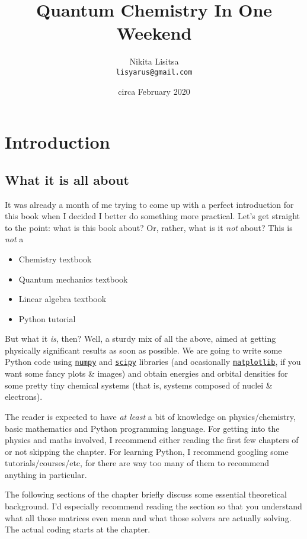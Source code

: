 \documentclass{book}
\title{Quantum Chemistry In One Weekend}
\author{Nikita Lisitsa \\ \texttt{lisyarus@gmail.com}}
\date{circa February 2020}
\begin{document}
\maketitle

\tableofcontents

\chapter{Introduction} \label{chap:intro}

\section{What it is all about}
It was already a month of me trying to come up with a perfect introduction for this book when I decided I better do something more practical. Let's get straight to the point: what is this book about? Or, rather, what is it \textit{not} about? This is \textit{not} a

\begin{itemize}
\item Chemistry textbook
\item Quantum mechanics textbook
\item Linear algebra textbook
\item Python tutorial
\end{itemize}

But what it \textit{is}, then? Well, a sturdy mix of all the above, aimed at getting physically significant results as soon as possible. We are going to write some Python code using \href{https://numpy.org}{\texttt{numpy}} and \href{https://www.scipy.org}{\texttt{scipy}} libraries (and ocasionally \href{https://matplotlib.org}{\texttt{matplotlib}}, if you want some fancy plots \& images) and obtain energies and orbital densities for some pretty tiny chemical systems (that is, systems composed of nuclei \& electrons).

The reader is expected to have \textit{at least} a bit of knowledge on physics/chemistry, basic mathematics and Python programming language. For getting into the physics and maths involved, I recommend either reading the first few chapters of \cite{ref:atkins} or not skipping the  chapter. For learning Python, I recommend googling some tutorials/courses/etc, for there are way too many of them to recommend anything in particular.

The following sections of the   chapter briefly discuss some essential theoretical background. I'd especially recommend reading the  section so that you understand what all those matrices even mean and what those solvers are actually solving. The actual coding starts at the  chapter.
\end{document}
